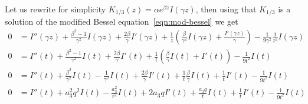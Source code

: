 \documentclass{article}
\theoremstyle{definition}
\theoremstyle{plain}
\newenvironment{verify}{\color{ForestGreen}}{\color{black}}
\begin{document}
\begin{itemize}
\begin{verify}
Let us rewrite for simplicity $K_{1/3}(z)=\alpha e^{\beta z} I(\gamma z)$, then using that $K_{1/3}$ is a solution of the modified Bessel equation~\eqref{eqn:mod-bessel} we get
\begin{align*}
0 &= I''(\gamma z)+\frac{\beta^2-1}{\gamma^2}I(\gamma z)+\frac{2\beta}{\gamma}I'(\gamma z)+\frac{1}{z}\left(\frac{\beta}{\gamma^2}I(\gamma z)+\frac{I'(\gamma z)}{\gamma}\right)-\frac{1}{9\gamma^2}\frac{1}{z^2} I(\gamma z) \\
0 &= I''(t)+\frac{\beta^2-1}{\gamma^2}I(t)+\frac{2\beta}{\gamma}I'(t)+\frac{1}{t}\left(\frac{\beta}{\gamma}I(t)+I'(t)\right)-\frac{1}{9t^2} I(t)\\
0 &= I''(t)+\frac{\beta^2}{\gamma^2}I(t)-\frac{1}{\gamma^2}I(t)+\frac{2\beta}{\gamma}I'(t)+\frac{1}{t}\frac{\beta}{\gamma}I(t)+\frac{1}{t}I'(t)-\frac{1}{9t^2} I(t)\\
0 &= I''(t)+a_3^2q^2 I(t)-\frac{a_3^2}{r^2}I(t)+2a_3 qI'(t)+\frac{a_3 q}{t}I(t)+\frac{1}{t}I'(t)-\frac{1}{9t^2} I(t)
\end{align*}


\end{verify}
\end{itemize}
\end{document}
